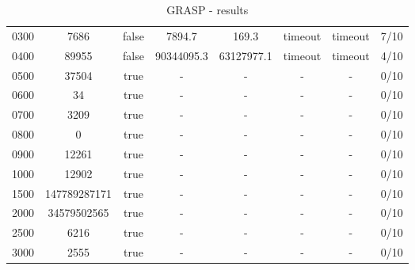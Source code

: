 \begin{table}
{\begin{tabular}{|| c | c | c | c | c | c | c | c ||}
0300 & 7686 & false & 7894.7 & 169.3 & timeout & timeout & 7/10 \\
0400 & 89955 & false & 90344095.3 & 63127977.1 & timeout & timeout & 4/10 \\
0500 & 37504 & true & - & - & - & - & 0/10 \\
0600 & 34 & true & - & - & - & - & 0/10 \\
0700 & 3209 & true & - & - & - & - & 0/10 \\
0800 & 0 & true & - & - & - & - & 0/10 \\
0900 & 12261 & true & - & - & - & - & 0/10 \\
1000 & 12902 & true & - & - & - & - & 0/10 \\
1500 & 147789287171 & true & - & - & - & - & 0/10 \\
2000 & 34579502565 & true & - & - & - & - & 0/10 \\
2500 & 6216 & true & - & - & - & - & 0/10 \\
3000 & 2555 & true & - & - & - & - & 0/10 \\
		\hline
	\end{tabular}
}
\caption{GRASP - results}
\end{table}